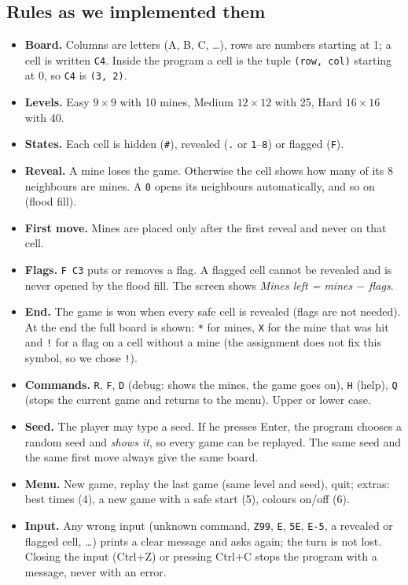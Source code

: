 \documentclass[11pt,a4paper]{article}
\newcommand{\code}[1]{\texttt{#1}}
\begin{document}
\subsection{Rules as we implemented them}
\begin{itemize}
\item \textbf{Board.} Columns are letters (A, B, C, \dots), rows are numbers starting at 1; a cell is
  written \code{C4}. Inside the program a cell is the tuple \code{(row, col)} starting at 0, so
  \code{C4} is \code{(3, 2)}.
\item \textbf{Levels.} Easy $9\times9$ with 10 mines, Medium $12\times12$ with 25, Hard $16\times16$ with 40.
\item \textbf{States.} Each cell is hidden (\code{\#}), revealed (\code{.} or \code{1}--\code{8}) or flagged (\code{F}).
\item \textbf{Reveal.} A mine loses the game. Otherwise the cell shows how many of its 8 neighbours
  are mines. A \code{0} opens its neighbours automatically, and so on (flood fill).
\item \textbf{First move.} Mines are placed only after the first reveal and never on that cell.
\item \textbf{Flags.} \code{F C3} puts or removes a flag. A flagged cell cannot be revealed and is
  never opened by the flood fill. The screen shows \emph{Mines left = mines $-$ flags}.
\item \textbf{End.} The game is won when every safe cell is revealed (flags are not needed). At the
  end the full board is shown: \code{*} for mines, \code{X} for the mine that was hit and \code{!} for
  a flag on a cell without a mine (the assignment does not fix this symbol, so we chose \code{!}).
\item \textbf{Commands.} \code{R}, \code{F}, \code{D} (debug: shows the mines, the game goes on),
  \code{H} (help), \code{Q} (stops the current game and returns to the menu). Upper or lower case.
\item \textbf{Seed.} The player may type a seed. If he presses Enter, the program chooses a random
  seed and \emph{shows it}, so every game can be replayed. The same seed and the same first move
  always give the same board.
\item \textbf{Menu.} New game, replay the last game (same level and seed), quit; extras: best times (4), a new game with a safe start (5), colours on/off (6).
\item \textbf{Input.} Any wrong input (unknown command, \code{Z99}, \code{E}, \code{5E}, \code{E-5},
  a revealed or flagged cell, \dots) prints a clear message and asks again; the turn is not lost.
  Closing the input (Ctrl+Z) or pressing Ctrl+C stops the program with a message, never with an error.
\end{itemize}
\end{document}
